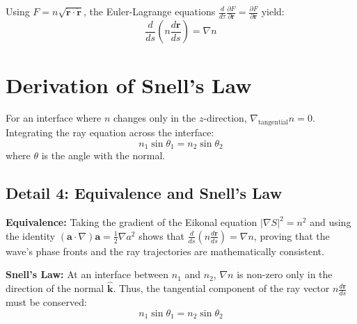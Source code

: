 \documentclass[12pt,a4paper]{article}
\begin{document}
\begin{tcolorbox}[colback=yellow!5!white,colframe=orange!75!black,title=Box 3: Deriving the Ray Equation]
Using $F = n \sqrt{\dot{\mathbf{r}} \cdot \dot{\mathbf{r}}}$, the Euler-Lagrange equations $\frac{d}{d\tau} \frac{\partial F}{\partial \dot{\mathbf{r}}} = \frac{\partial F}{\partial \mathbf{r}}$ yield:
$$\frac{d}{ds} \left( n \frac{d\mathbf{r}}{ds} \right) = \nabla n$$
\end{tcolorbox}
\section{Derivation of Snell's Law}
For an interface where $n$ changes only in the $z$-direction, $\nabla_{\text{tangential}} n = 0$. Integrating the ray equation across the interface:
\begin{equation}
n_1 \sin \theta_1 = n_2 \sin \theta_2
\end{equation}
where $\theta$ is the angle with the normal.



\subsection{Detail 4: Equivalence and Snell's Law}
\textbf{Equivalence:} Taking the gradient of the Eikonal equation $|\nabla S|^2 = n^2$ and using the identity $(\mathbf{a} \cdot \nabla)\mathbf{a} = \frac{1}{2}\nabla a^2$ shows that $\frac{d}{ds}(n \frac{d\mathbf{r}}{ds}) = \nabla n$, proving that the wave's phase fronts and the ray trajectories are mathematically consistent.

\textbf{Snell's Law:} At an interface between $n_1$ and $n_2$, $\nabla n$ is non-zero only in the direction of the normal $\mathbf{\hat{k}}$. Thus, the tangential component of the ray vector $n \frac{d\mathbf{r}}{ds}$ must be conserved:
$$n_1 \sin \theta_1 = n_2 \sin \theta_2$$
\end{document}
